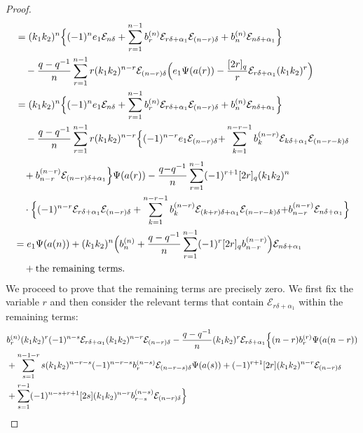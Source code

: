 \documentclass[12pt]{amsart}
\numberwithin{equation}{section}
\numberwithin{equation}{section}
\begin{document}
\begin{proof}
\begin{align*}
&=(k_1k_2)^n \Bigl\{(-1)^ne_1\mathcal{E}_{n\delta} + \sum\limits_{r=1}^{n-1}b^{(n)}_r\mathcal{E}_{r\delta+\alpha_1}\mathcal{E}_{(n-r)\delta} + b^{(n)}_n\mathcal{E}_{n\delta+\alpha_1}\Bigr\}\\
&\quad- \frac{q - q^{-1}}{n}\sum\limits_{r=1}^{n-1}r(k_1k_2)^{n-r}\mathcal{E}_{(n-r)\delta}\Bigl(e_1\Psi(a(r))-\dfrac{[2r]_q}{r} \mathcal{E}_{r\delta+\alpha_1}(k_1k_2)^r\Bigr)
\\
&=(k_1k_2)^n \Bigl\{(-1)^ne_1\mathcal{E}_{n\delta} + \sum\limits_{r=1}^{n-1}b^{(n)}_r\mathcal{E}_{r\delta+\alpha_1}\mathcal{E}_{(n-r)\delta} + b^{(n)}_n\mathcal{E}_{n\delta+\alpha_1}\Bigr\}
\\
&\quad-\frac{q - q^{-1}}{n}\sum\limits_{r=1}^{n-1}r(k_1k_2)^{n-r}\Bigl\{(-1)^{n-r}e_1\mathcal{E}_{(n-r)\delta} {+} \sum\limits_{k=1}^{n-r-1}b^{(n-r)}_k\mathcal{E}_{k\delta+\alpha_1}\mathcal{E}_{(n-r-k)\delta}
\end{align*}
\begin{align*}
&\quad+ b^{(n-r)}_{n-r}\mathcal{E}_{(n-r)\delta+\alpha_1}\Bigr\}\Psi(a(r)) - \frac{q {-} q^{-1}}{n}\sum\limits_{r=1}^{n-1}(-1)^{r+1}[2r]_q(k_1k_2)^{n}\\
&\quad\cdot\Bigl\{(-1)^{n-r}\mathcal{E}_{r\delta+\alpha_1}\mathcal{E}_{(n-r)\delta}+\sum\limits_{k=1}^{n-r-1}b^{(n-r)}_k\mathcal{E}_{(k+r)\delta+\alpha_1}\mathcal{E}_{(n-r-k)\delta}{+} b^{(n-r)}_{n-r}\mathcal{E}_{n\delta+\alpha_1}\Bigr\}\\
&=e_1\Psi(a(n))+(k_1k_2)^n\Bigl(b^{(n)}_n+\dfrac{q-q^{-1}}{n}\sum\limits_{r=1}^{n-1}(-1)^r[2r]_qb^{(n-r)}_{n-r}\Bigr)\mathcal{E}_{n\delta+\alpha_1}\\
&\quad+\text{the remaining terms}.
\end{align*}
We proceed to prove that the remaining terms are precisely zero. We first fix the variable 
\(r\) and then consider the relevant terms that contain \(\mathcal{E}_{r\delta+\alpha_1}\) within the remaining terms:
\begin{align*}
&b^{(n)}_r(k_1k_2)^r(-1)^{n-s}\mathcal{E}_{r\delta+\alpha_1}(k_1k_2)^{n-r}\mathcal{E}_{(n-r)\delta}-\dfrac{q-q^{-1}}{n}(k_1k_2)^r\mathcal{E}_{r\delta+\alpha_1}\Bigl\{(n-r)b^{(r)}_r\Psi(a(n-r))\\
&+\sum\limits_{s=1}^{n-1-r}s(k_1k_2)^{n-r-s}(-1)^{n-r-s}b^{(n-s)}_r\mathcal{E}_{(n-r-s)\delta}\Psi(a(s))+(-1)^{r+1}[2r](k_1k_2)^{n-r}\mathcal{E}_{(n-r)\delta}\\
&+\sum\limits_{s=1}^{r-1}(-1)^{n-s+r+1}[2s](k_1k_2)^{n-r}b^{(n-s)}_{r-s}\mathcal{E}_{(n-r)\delta}\Bigr\}\\

\end{align*}
\end{proof}
\end{document}
